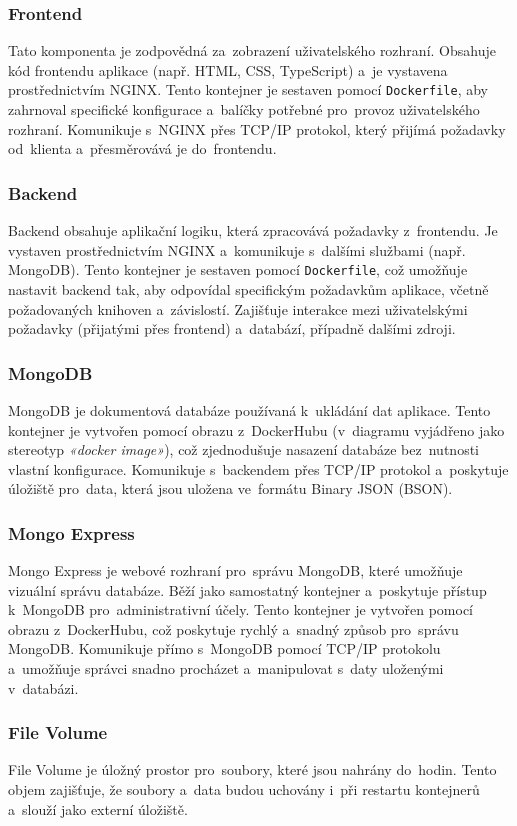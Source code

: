 \documentclass[male,czech,api_bc]{kitheses}
\begin{document}
\subsubsection{Frontend}
Tato komponenta je zodpovědná za~zobrazení uživatelského rozhraní. Obsahuje kód frontendu aplikace (např. HTML, CSS, TypeScript) a~je vystavena prostřednictvím NGINX. Tento kontejner je sestaven pomocí \texttt{Dockerfile}, aby zahrnoval specifické konfigurace a~balíčky potřebné pro~provoz uživatelského rozhraní. Komunikuje s~NGINX přes TCP/IP protokol, který přijímá požadavky od~klienta a~přesměrovává je do~frontendu.

\subsubsection{Backend}
Backend obsahuje aplikační logiku, která zpracovává požadavky z~frontendu. Je vystaven prostřednictvím NGINX a~komunikuje s~dalšími službami (např. MongoDB). Tento kontejner je sestaven pomocí \texttt{Dockerfile}, což umožňuje nastavit backend tak, aby odpovídal specifickým požadavkům aplikace, včetně požadovaných knihoven a~závislostí. Zajišťuje interakce mezi uživatelskými požadavky (přijatými přes frontend) a~databází, případně dalšími zdroji.

\subsubsection{MongoDB}
MongoDB je dokumentová databáze používaná k~ukládání dat aplikace. Tento kontejner je vytvořen pomocí obrazu z~DockerHubu (v~diagramu vyjádřeno jako stereotyp \textit{«docker image»}), což zjednodušuje nasazení databáze bez~nutnosti vlastní konfigurace. Komunikuje s~backendem přes TCP/IP protokol a~poskytuje úložiště pro~data, která jsou uložena ve~formátu Binary JSON (BSON).

\subsubsection{Mongo Express}
Mongo Express je webové rozhraní pro~správu MongoDB, které umožňuje vizuální správu databáze. Běží jako samostatný kontejner a~poskytuje přístup k~MongoDB pro~administrativní účely. Tento kontejner je vytvořen pomocí obrazu z~DockerHubu, což poskytuje rychlý a~snadný způsob pro~správu MongoDB. Komunikuje přímo s~MongoDB pomocí TCP/IP protokolu a~umožňuje správci snadno procházet a~manipulovat s~daty uloženými v~databázi.

\subsubsection{File Volume}
File Volume je úložný prostor pro~soubory, které jsou nahrány do~hodin. Tento objem zajišťuje, že soubory a~data budou uchovány i~při restartu kontejnerů a~slouží jako externí úložiště.
\end{document}
